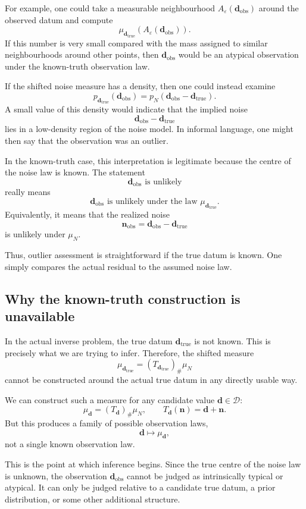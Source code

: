 \documentclass[11pt]{article}
\newcommand{\Dspace}{\mathcal D}
\newcommand{\muN}{\mu_N}
\newcommand{\dtrue}{\mathbf d_{\mathrm{true}}}
\newcommand{\dobs}{\mathbf d_{\mathrm{obs}}}
\newcommand{\nobs}{\mathbf n_{\mathrm{obs}}}
\begin{document}
For example, one could take a measurable neighbourhood \(A_{\varepsilon}(\dobs)\) around the observed datum and compute
\[
    \mu_{\dtrue}\!\left(A_{\varepsilon}(\dobs)\right).
\]
If this number is very small compared with the mass assigned to similar neighbourhoods around other points, then \(\dobs\) would be an atypical observation under the known-truth observation law.

If the shifted noise measure has a density, then one could instead examine
\[
    p_{\dtrue}(\dobs)
    =
    p_N(\dobs-\dtrue).
\]
A small value of this density would indicate that the implied noise
\[
    \dobs-\dtrue
\]
lies in a low-density region of the noise model. In informal language, one might then say that the observation was an outlier.

In the known-truth case, this interpretation is legitimate because the centre of the noise law is known. The statement
\[
    \dobs
    \text{ is unlikely}
\]
really means
\[
    \dobs
    \text{ is unlikely under the law }
    \mu_{\dtrue}.
\]
Equivalently, it means that the realized noise
\[
    \nobs=\dobs-\dtrue
\]
is unlikely under \(\muN\).

Thus, outlier assessment is straightforward if the true datum is known. One simply compares the actual residual to the assumed noise law.

\subsection{Why the known-truth construction is unavailable}

In the actual inverse problem, the true datum \(\dtrue\) is not known. This is precisely what we are trying to infer. Therefore, the shifted measure
\[
    \mu_{\dtrue}
    =
    (T_{\dtrue})_{\#}\muN
\]
cannot be constructed around the actual true datum in any directly usable way.

We can construct such a measure for any candidate value \(\mathbf d\in\Dspace\):
\[
    \mu_{\mathbf d}
    =
    (T_{\mathbf d})_{\#}\muN,
    \qquad
    T_{\mathbf d}(\mathbf n)=\mathbf d+\mathbf n.
\]
But this produces a family of possible observation laws,
\[
    \mathbf d
    \longmapsto
    \mu_{\mathbf d},
\]
not a single known observation law.

This is the point at which inference begins. Since the true centre of the noise law is unknown, the observation \(\dobs\) cannot be judged as intrinsically typical or atypical. It can only be judged relative to a candidate true datum, a prior distribution, or some other additional structure.
\end{document}
